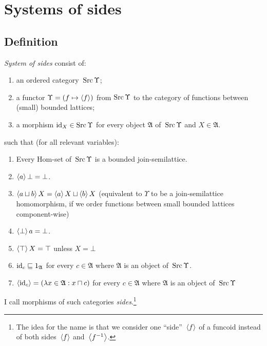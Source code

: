 \chapter{Systems of sides}

\section{Definition}


\begin{defn}
\emph{System of sides} consist of:
\begin{enumerate}
\item an ordered category~$\operatorname{Src}\Upsilon$;
\item a functor $\Upsilon = (f\mapsto\left\langle f\right\rangle)$ from $\operatorname{Src}\Upsilon$
  to the category of functions between (small) bounded lattices;
\item a morphism $\operatorname{id}_X\in\operatorname{Src}\Upsilon$ for every object $\mathfrak{A}$ of~$\operatorname{Src}\Upsilon$ and $X\in\mathfrak{A}$.
\end{enumerate}
such that (for all relevant variables):
\begin{enumerate}
  \item Every Hom-set of~$\operatorname{Src}\Upsilon$ is a bounded join-semilattice.

  \item $\left\langle a\right\rangle\bot = \bot$.

  \item $\left\langle a \sqcup b\right\rangle X = \left\langle a\right\rangle X \sqcup \left\langle b\right\rangle X$ (equivalent to $\Upsilon$ to be a join-semilattice homomorphism,
    if we order functions between small bounded lattices component-wise)

  \item $\left\langle \bot\right\rangle a = \bot$.

  \item $\left\langle \top\right\rangle X = \top$ unless $X = \bot$

  \item $\operatorname{id}_c \sqsubseteq 1_{\mathfrak{A}}$ for every $c \in \mathfrak{A}$
    where $\mathfrak{A}$ is an object of~$\operatorname{Src}\Upsilon$.

  \item $\left\langle \operatorname{id}_c\right\rangle = (\lambda x \in \mathfrak{A}: x \sqcap c)$ for every $c \in \mathfrak{A}$
    where $\mathfrak{A}$ is an object of~$\operatorname{Src}\Upsilon$
\end{enumerate}
I call morphisms of such categories \emph{sides}.\footnote{The idea for the name is that we consider one ``side''~$\left\langle f\right\rangle$ of a funcoid instead of both sides~$\left\langle f\right\rangle$ and~$\left\langle f^{-1}\right\rangle$.}
\end{defn}

